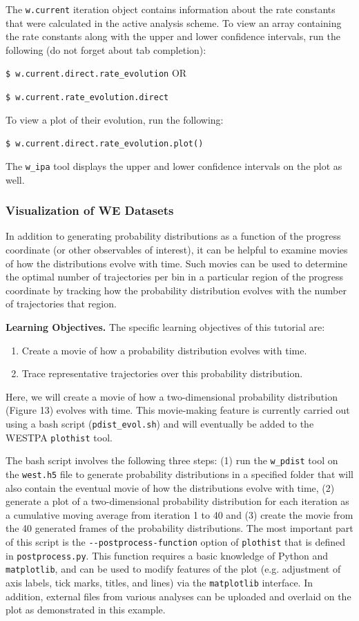 \documentclass[9pt,tutorial,pubversion]{livecoms}
\begin{document}
The \verb|w.current| iteration object contains information about the rate constants that were calculated in the active analysis scheme. 
To view an array containing the rate constants along with the upper and lower confidence intervals, run the following (do not forget about tab completion): 

\verb|$ w.current.direct.rate_evolution| OR 

\verb|$ w.current.rate_evolution.direct|

To view a plot of their evolution, run the following:

\verb|$ w.current.direct.rate_evolution.plot()|

The \verb|w_ipa| tool displays the upper and lower confidence intervals on the plot as well. 

\subsubsection{Visualization of WE Datasets}

In addition to generating probability distributions as a function of the progress coordinate (or other observables of interest), it can be helpful to examine movies of how the distributions evolve with time. 
Such movies can be used to determine the optimal number of trajectories per bin in a particular region of the progress coordinate by tracking how the probability distribution evolves with the number of trajectories that region. 

\textbf{Learning Objectives.} The specific learning objectives of this tutorial are:
\begin{enumerate}
\item Create a movie of how a probability distribution evolves with time.
\item Trace representative trajectories over this probability distribution.
\end{enumerate}

Here, we will create a movie of how a two-dimensional probability distribution (Figure 13) evolves with time. 
This movie-making feature is currently carried out using a bash script (\verb|pdist_evol.sh|) and will eventually be added to the WESTPA \verb|plothist| tool. 

The bash script involves the following three steps: (1) run the \verb|w_pdist| tool on the \verb|west.h5| file to generate probability distributions in a specified folder that will also contain the eventual movie of how the distributions evolve with time, (2) generate a plot of a two-dimensional probability distribution for each iteration as a cumulative moving average from iteration 1 to 40 and (3) create the movie from the 40 generated frames of the probability distributions. 
The most important part of this script is the \verb|--postprocess-function| option of \verb|plothist| that is defined in \verb|postprocess.py|. 
This function requires a basic knowledge of Python and \verb|matplotlib|, and can be used to modify features of the plot (e.g. adjustment of axis labels, tick marks, titles, and lines) via the \verb|matplotlib| interface. 
In addition, external files from various analyses can be uploaded and overlaid on the plot as demonstrated in this example. 
\end{document}
